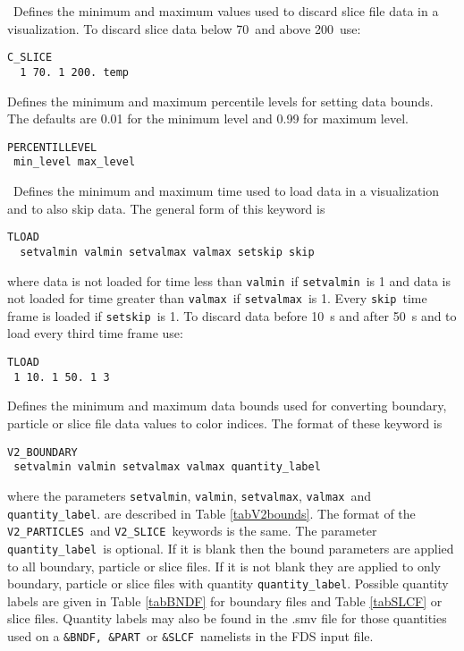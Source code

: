 \documentclass[11pt,twoside]{book}
\newcommand{\hitemNULL}[1]{}
\begin{document}
{\ Defines the minimum and maximum values used to
discard slice file data in a visualization. To discard slice data
below 70\degC\ and above 200\degC\ use:

\begin{lstlisting}
C_SLICE
  1 70. 1 200. temp
\end{lstlisting}

\hitemNULL{CACHE\_BOUNDARYDATA}

\hitemNULL{CACHE\_QDATA}

\hitemNULL{PATCHDATAOUT}

 Defines the minimum and maximum percentile levels for setting data bounds.
The defaults are 0.01 for the minimum level and 0.99 for maximum level.

\begin{lstlisting}
PERCENTILLEVEL
 min_level max_level
\end{lstlisting}

\hitemNULL{SLICEDATAOUT}

\hitemNULL{TIMEOFFSET}

\ Defines the minimum and maximum time used to
load data in a visualization and to also skip data.
The general form of this keyword is
\begin{lstlisting}
TLOAD
  setvalmin valmin setvalmax valmax setskip skip
\end{lstlisting}

\noindent where data is not loaded for time
less than {\tt valmin}\ if {\tt setvalmin}\ is 1
and data is not loaded for time greater than {\tt valmax}\ if {\tt setvalmax}\ is 1.
Every {\tt skip}\ time frame is loaded if {\tt setskip}\ is 1.  To discard data before
10~s and after 50~s and to load every third time frame use:

\begin{lstlisting}
TLOAD
 1 10. 1 50. 1 3
\end{lstlisting}

Defines the minimum and maximum
data bounds used for converting boundary, particle or slice file data values to color indices.
The format of these keyword is
\begin{lstlisting}
V2_BOUNDARY
 setvalmin valmin setvalmax valmax quantity_label
\end{lstlisting}
where the parameters
{\tt setvalmin}, {\tt valmin}, {\tt setvalmax}, {\tt valmax}\ and {\tt quantity\_label}.
are described in Table \ref{tabV2bounds}.
The format of the {\tt V2\_PARTICLES}\ and {\tt V2\_SLICE}\ keywords is the same.
The parameter {\tt quantity\_label}\ is optional.  If it is blank then the bound
parameters are applied to all boundary, particle or slice files.
If it is not blank they
are applied to only boundary, particle or slice files with quantity {\tt quantity\_label}.
Possible quantity labels are given in Table \ref{tabBNDF} for boundary files and Table \ref{tabSLCF} or slice files.
Quantity labels may also be found in the .smv file for those quantities used
on a {\tt \&BNDF, \&PART}\ or {\tt \&SLCF}\ namelists in the FDS input file.

}
\end{document}

